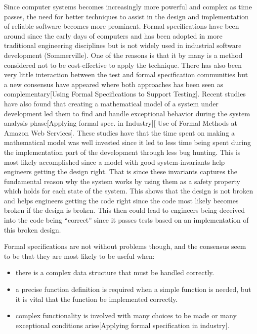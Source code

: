 \documentclass{article}
\begin{document}
Since computer systems becomes increasingly more powerful and complex as time passes, the need for better techniques to assist in the design and implementation of reliable software becomes more prominent. Formal specifications have been around since the early days of computers and has been adopted in more traditional engineering disciplines but is not widely used in industrial software development (Sommerville). One of the reasons is that it by many is a method considered not to be cost-effective to apply the technique. There has also been very little interaction between the test and formal specification communities but a new consensus have appeared where both approaches has been seen as complementary[Using Formal Specifications to Support Testing]. Recent studies have also found that creating a mathematical model of a system under development led them to find and handle exceptional behavior during the system analysis phase[Applying formal spec. in Industry][ Use of Formal Methods at Amazon Web Services]. These studies have that the time spent on making a mathematical model was well invested since it led to less time being spent during the implementation part of the development through less bug hunting. This is most likely accomplished since a model with good system-invariants help engineers getting the design right. That is since these invariants captures the fundamental reason why the system works by using them as a safety property which holds for each state of the system. This shows that the design is not broken and helps engineers getting the code right since the code most likely becomes broken if the design is broken. This then could lead to engineers being deceived into the code being “correct” since it passes tests based on an implementation of this broken design. 

Formal specifications are not without problems though, and the consensus seem to be that they are most likely to be useful when:

\begin{itemize}
  \item there is a complex data structure that must be handled correctly.
  \item a precise function definition is required when a simple function is needed, but it is vital that the function be implemented correctly.
  \item complex functionality is involved with many choices to be made or many exceptional conditions arise[Applying formal specification in industry].
\end{itemize}
\end{document}
